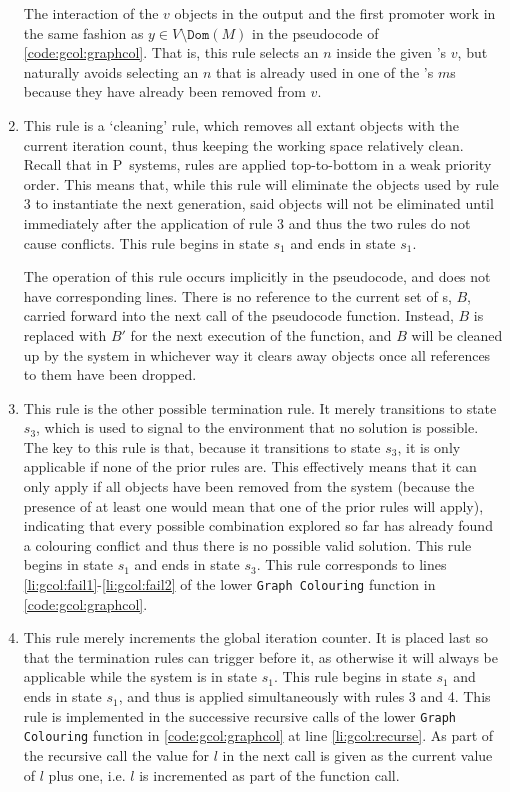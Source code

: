 \begin{enumerate}
The interaction of the \(v\) objects in the output and the first promoter work in the same fashion as \(y \in V \setminus \texttt{Dom}(M)\) in the pseudocode of \cref{code:gcol:graphcol}.  That is, this rule selects an \(n\) inside the given \bo{}'s \(v\), but naturally avoids selecting an \(n\) that is already used in one of the \bo{}'s \(m\)s because they have already been removed from \(v\).

\item This rule is a `cleaning' rule, which removes all extant \bo{} objects with the current iteration count, thus keeping the working space relatively clean.  Recall that in P~systems, rules are applied top-to-bottom in a  weak priority order.  This means that, while this rule will eliminate the \bo{} objects used by rule 3 to instantiate the next generation, said objects will not be eliminated until immediately after the application of rule 3 and thus the two rules do not cause conflicts.  This rule begins in state \(s_1\) and ends in state \(s_1\).

The operation of this rule occurs implicitly in the pseudocode, and does not have corresponding lines.  There is no reference to the current set of \bo{}s, \(B\), carried forward into the next call of the pseudocode function.  Instead, \(B\) is replaced with \(B'\) for the next execution of the function, and \(B\) will be cleaned up by the system in whichever way it clears away objects once all references to them have been dropped.

\item This rule is the other possible termination rule.  It merely transitions to state \(s_3\), which is used to signal to the environment that no solution is possible.  The key to this rule is that, because it transitions to state \(s_3\), it is only applicable if none of the prior rules are.  This effectively means that it can only apply if all \bo{} objects have been removed from the system (because the presence of at least one \bo{} would mean that one of the prior rules will apply), indicating that every possible combination explored so far has already found a colouring conflict and thus there is no possible valid solution.  This rule begins in state \(s_1\) and ends in state \(s_3\).  This rule corresponds to lines \ref{li:gcol:fail1}-\ref{li:gcol:fail2} of the lower \texttt{Graph Colouring} function in \cref{code:gcol:graphcol}.

\item This rule merely increments the global iteration counter.  It is placed last so that the termination rules can trigger before it, as otherwise it will always be applicable while the system is in state \(s_1\).  This rule begins in state \(s_1\) and ends in state \(s_1\), and thus is applied simultaneously with rules 3 and 4.  This rule is implemented in the successive recursive calls of the lower \texttt{Graph Colouring} function in \cref{code:gcol:graphcol} at line \ref{li:gcol:recurse}.  As part of the recursive call the value for \(l\) in the next call is given as the current value of \(l\) plus one, i.e. \(l\) is incremented as part of the function call.
\end{enumerate}

